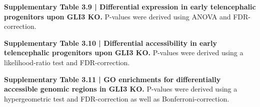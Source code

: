 \vspace{0.25cm}
\noindent
{\normalfont\footnotesize\sffamily\textbf{Supplementary Table 3.9 | Differential expression in early telencephalic progenitors upon GLI3 KO.} P-values were derived using ANOVA and FDR-correction.}

\vspace{0.25cm}
\noindent
{\normalfont\footnotesize\sffamily\textbf{Supplementary Table 3.10 | Differential accessibility in early telencephalic progenitors upon GLI3 KO.} P-values were derived using a likelihood-ratio test and FDR-correction.}

\vspace{0.25cm}
\noindent
{\normalfont\footnotesize\sffamily\textbf{Supplementary Table 3.11 | GO enrichments for differentially accessible genomic regions in GLI3 KO.} P-values were derived using a hypergeometric test and FDR-correction as well as Bonferroni-correction.}



 









